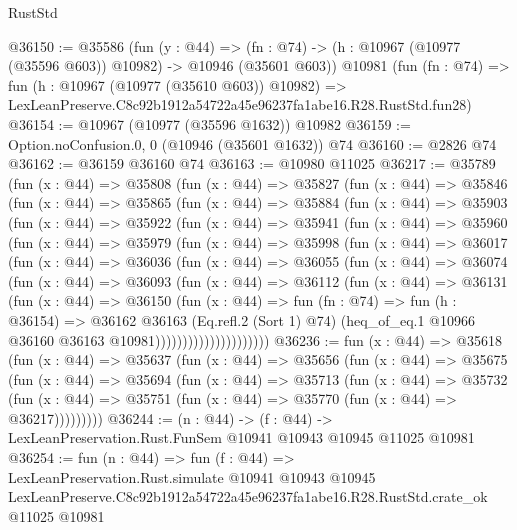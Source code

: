 \begin{lexlean}{RustStd}
\begin{coremodule}
@36150 := @35586
    (fun (y : @44) =>
    (fn : @74) -> (h : @10967 (@10977 (@35596 @603)) @10982) -> @10946 (@35601 @603))
    @10981
    (fun (fn : @74) =>
    fun (h : @10967 (@10977 (@35610 @603)) @10982) =>
    LexLeanPreserve.C8c92b1912a54722a45e96237fa1abe16.R28.RustStd.fun28)
@36154 := @10967 (@10977 (@35596 @1632)) @10982
@36159 := Option.noConfusion.{0, 0} (@10946 (@35601 @1632)) @74
@36160 := @2826 @74
@36162 := @36159 @36160 @74
@36163 := @10980 @11025
@36217 := @35789
    (fun (x : @44) =>
    @35808
      (fun (x : @44) =>
      @35827
        (fun (x : @44) =>
        @35846
          (fun (x : @44) =>
          @35865
            (fun (x : @44) =>
            @35884
              (fun (x : @44) =>
              @35903
                (fun (x : @44) =>
                @35922
                  (fun (x : @44) =>
                  @35941
                    (fun (x : @44) =>
                    @35960
                      (fun (x : @44) =>
                      @35979
                        (fun (x : @44) =>
                        @35998
                          (fun (x : @44) =>
                          @36017
                            (fun (x : @44) =>
                            @36036
                              (fun (x : @44) =>
                              @36055
                                (fun (x : @44) =>
                                @36074
                                  (fun (x : @44) =>
                                  @36093
                                    (fun (x : @44) =>
                                    @36112
                                      (fun (x : @44) =>
                                      @36131
                                        (fun (x : @44) =>
                                        @36150
                                          (fun (x : @44) =>
                                          fun (fn : @74) =>
                                          fun (h : @36154) =>
                                          @36162
                                            @36163
                                            (Eq.refl.{2} (Sort 1) @74)
                                            (heq_of_eq.{1}
                                              @10966
                                              @36160
                                              @36163
                                              @10981)))))))))))))))))))))
@36236 := fun (x : @44) =>
  @35618
    (fun (x : @44) =>
    @35637
      (fun (x : @44) =>
      @35656
        (fun (x : @44) =>
        @35675
          (fun (x : @44) =>
          @35694
            (fun (x : @44) =>
            @35713
              (fun (x : @44) =>
              @35732
                (fun (x : @44) => @35751 (fun (x : @44) => @35770 (fun (x : @44) => @36217)))))))))
@36244 := (n : @44) ->
  (f : @44) -> LexLeanPreservation.Rust.FunSem @10941 @10943 @10945 @11025 @10981
@36254 := fun (n : @44) =>
  fun (f : @44) =>
  LexLeanPreservation.Rust.simulate
    @10941
    @10943
    @10945
    LexLeanPreserve.C8c92b1912a54722a45e96237fa1abe16.R28.RustStd.crate_ok
    @11025
    @10981
\end{coremodule}
\end{lexlean}
